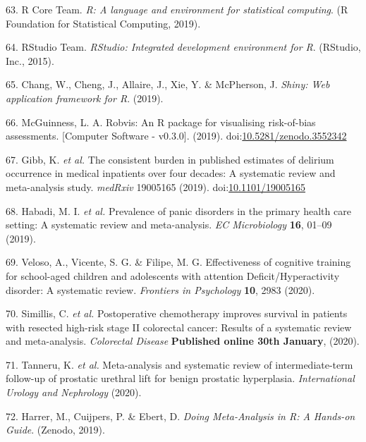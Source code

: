 \documentclass[a4paper, twoside]{templates/ociamthesis}
\begin{document}
\leavevmode\hypertarget{ref-rref}{}%
63. R Core Team. \emph{R: A language and environment for statistical computing}. (R Foundation for Statistical Computing, 2019).

\leavevmode\hypertarget{ref-rstudioref}{}%
64. RStudio Team. \emph{RStudio: Integrated development environment for R}. (RStudio, Inc., 2015).

\leavevmode\hypertarget{ref-shinyref}{}%
65. Chang, W., Cheng, J., Allaire, J., Xie, Y. \& McPherson, J. \emph{Shiny: Web application framework for R}. (2019).

\leavevmode\hypertarget{ref-mcguinness2019a}{}%
66. McGuinness, L. A. Robvis: An R package for visualising risk-of-bias assessments. {[}Computer Software - v0.3.0{]}. (2019). doi:\href{https://doi.org/10.5281/zenodo.3552342}{10.5281/zenodo.3552342}

\leavevmode\hypertarget{ref-gibb2019consistent}{}%
67. Gibb, K. \emph{et al.} The consistent burden in published estimates of delirium occurrence in medical inpatients over four decades: A systematic review and meta-analysis study. \emph{medRxiv} 19005165 (2019). doi:\href{https://doi.org/10.1101/19005165}{10.1101/19005165}

\leavevmode\hypertarget{ref-habadi2019prevalence}{}%
68. Habadi, M. I. \emph{et al.} Prevalence of panic disorders in the primary health care setting: A systematic review and meta-analysis. \emph{EC Microbiology} \textbf{16}, 01--09 (2019).

\leavevmode\hypertarget{ref-veloso2020effectiveness}{}%
69. Veloso, A., Vicente, S. G. \& Filipe, M. G. Effectiveness of cognitive training for school-aged children and adolescents with attention Deficit/Hyperactivity disorder: A systematic review. \emph{Frontiers in Psychology} \textbf{10}, 2983 (2020).

\leavevmode\hypertarget{ref-simillis2020}{}%
70. Simillis, C. \emph{et al.} Postoperative chemotherapy improves survival in patients with resected high-risk stage II colorectal cancer: Results of a systematic review and meta-analysis. \emph{Colorectal Disease} \textbf{Published online 30th January}, (2020).

\leavevmode\hypertarget{ref-tanneru2020}{}%
71. Tanneru, K. \emph{et al.} Meta-analysis and systematic review of intermediate-term follow-up of prostatic urethral lift for benign prostatic hyperplasia. \emph{International Urology and Nephrology} (2020).

\leavevmode\hypertarget{ref-mathias_harrer_2019_2551803}{}%
72. Harrer, M., Cuijpers, P. \& Ebert, D. \emph{Doing Meta-Analysis in R: A Hands-on Guide}. (Zenodo, 2019).
\end{document}
